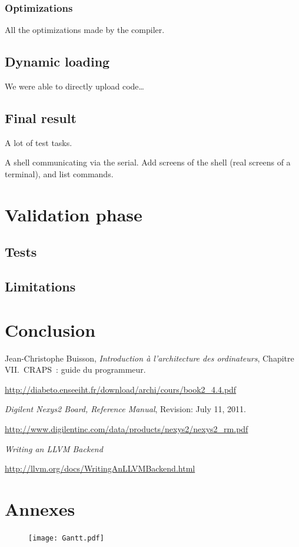 \documentclass[openany, a4paper]{book}
\begin{document}
      \subsection{Optimizations}
        All the optimizations made by the compiler.

    \section{Dynamic loading}
      We were able to directly upload code\dots

    \section{Final result}
      A lot of test tasks.

      A shell communicating via the serial.
      Add screens of the shell (real screens of a terminal), and list commands.

  \chapter{Validation phase}

    \section{Tests}

    \section{Limitations}

  \chapter{Conclusion}

  \begin{thebibliography}{9}
      Jean-Christophe Buisson,
      \emph{Introduction à l'architecture des ordinateurs},
      Chapitre VII.\ CRAPS~: guide du programmeur.

      \mbox{\url{http://diabeto.enseeiht.fr/download/archi/cours/book2_4.4.pdf}}

      \emph{Digilent Nexys2 Board, Reference Manual},
      Revision: July 11, 2011.

      \mbox{\url{http://www.digilentinc.com/data/products/nexys2/nexys2_rm.pdf}}

      \emph{Writing an LLVM Backend}

      \mbox{\url{http://llvm.org/docs/WritingAnLLVMBackend.html}}
  \end{thebibliography}

  \chapter*{Annexes}
    \thispagestyle{empty}
    \begin{figure}
      \centering
      \texttt{[image: Gantt.pdf]}
      \label{fig:gantt}
    \end{figure}
    \clearpage
    \restoregeometry
\end{document}
